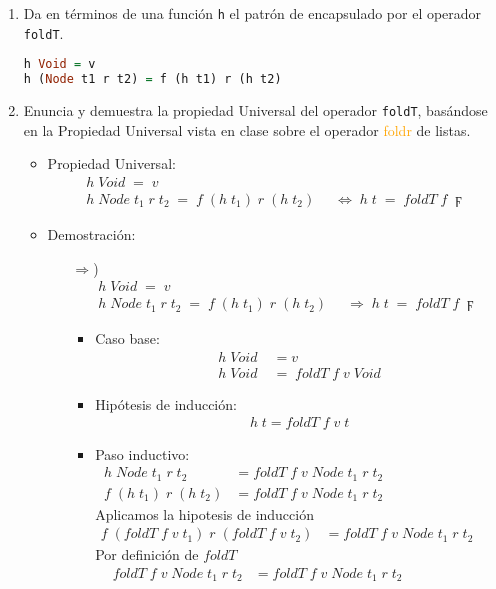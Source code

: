 \documentclass[spanish,12pt,letterpaper]{article}
\begin{document}
\begin{enumerate}
\item Da en términos de una función \texttt{h} el patrón de encapsulado por el
  operador \texttt{foldT}.
\begin{lstlisting}[language=Haskell]
h Void = v
h (Node t1 r t2) = f (h t1) r (h t2)\end{lstlisting}

\item Enuncia y demuestra la propiedad Universal del operador \texttt{foldT},
  basándose en la Propiedad Universal vista en clase sobre el operador
  \textcolor{orange}{foldr} de listas.
\begin{itemize}
\item Propiedad Universal:\\
\begin{align*}
h\;Void\; = \;v \qquad \qquad \qquad \qquad \;\;\;\;\;\;\\
h\;Node\;t_1\;r\;t_2\;=\;f\;(h\;t_1)\;r\;(h\;t_2)\;&\;\Leftrightarrow\;h\;t\;=\;foldT\;f\;\digamma
\end{align*}
\item Demostración: \\

\begin{itemize}
\item[$\Rightarrow$)]
\begin{align*}
h\;Void\; = \;v \qquad \qquad \qquad \qquad \;\;\;\;\;\;\\
h\;Node\;t_1\;r\;t_2\;=\;f\;(h\;t_1)\;r\;(h\;t_2)\;&\;\Rightarrow\;h\;t\;=\;foldT\;f\;\digamma
\end{align*}

\begin{itemize}
\item Caso base:\\
	\begin{align*}
	h\;Void\;&= v \\
	h\;Void\;&=\;foldT\;f\;v\;Void
	\end{align*}
\item Hipótesis de inducción:
	\begin{align*}
	h\;t=foldT\;f\;v\;t
	\end{align*}
\item Paso inductivo:
\begin{align*}
h\;Node\;t_1\;r\;t_2 &=foldT\;f\;v\;Node\;t_1\;r\;t_2\\
f\;(h\;t_1)\;r\;(h\;t_2) &=foldT\;f\;v\;Node\;t_1\;r\;t_2
\qquad \qquad\qquad\qquad
\end{align*}
Aplicamos la hipotesis de inducción
\begin{align*}
f\;(foldT\;f\;v\;t_1)\;r\;(foldT\;f\;v\;t_2)&=foldT\;f\;v\;Node\;t_1\;r\;t_2\qquad\qquad\qquad\qquad
\end{align*}
Por definición de $foldT$
\begin{align*}
foldT\;f\;v\;Node\;t_1\;r\;t_2&=foldT\;f\;v\;Node\;t_1\;r\;t_2\qquad\qquad\qquad
\end{align*}
\end{itemize}
\end{itemize}
\end{itemize}
\end{enumerate}
\end{document}
